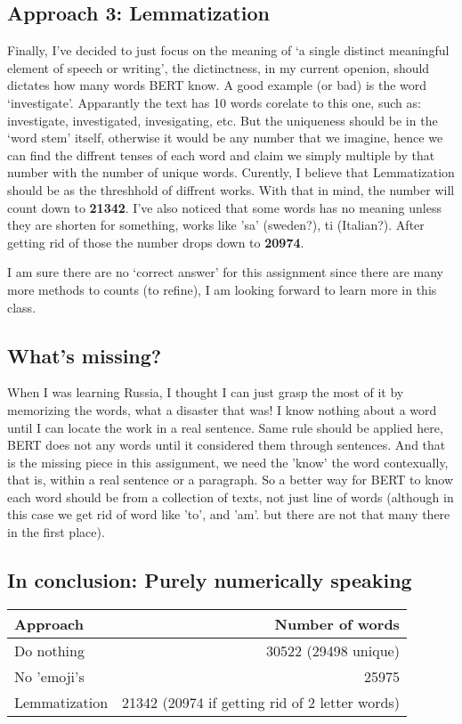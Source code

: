 \documentclass{article}
\begin{document}
		\subsection*{Approach 3: Lemmatization}
	Finally, I've decided to just focus on the meaning of `a single distinct meaningful element of speech or writing', the dictinctness, in my current openion, should dictates how many words BERT know. A good example (or bad) is the word `investigate'. Apparantly the text has 10 words corelate to this one, such as: investigate, investigated, invesigating, etc.  But the uniqueness should be in the `word  stem' itself, otherwise it would be any number that we imagine, hence we can find the diffrent tenses of each word and claim we simply multiple by that number with the number of unique words. Curently, I believe that Lemmatization should be as the threshhold of diffrent works. With that in mind, the number will count down to \textbf{21342}. I've also noticed  that some words has no meaning unless they are shorten for  something, works like 'sa' (sweden?), ti (Italian?). After getting rid of those the number drops down to \textbf{20974}. 
	
    I am sure there are no `correct answer' for this assignment since there are many more methods to counts (to refine), I am looking forward to learn more in this class. 
		\subsection*{What's missing?}
	When I was learning Russia, I thought I can just grasp the most of it by memorizing the words, what a disaster that was! I know nothing about a word until I can locate the work in a real sentence. Same rule should be applied here, BERT does not any words until it considered them through sentences. And that is the missing piece in this assignment, we need the 'know' the word contexually, that is, within a real sentence or a paragraph. So a better way for BERT to know each word should be from a collection of texts, not just line of words (although in this case we get rid of word like 'to', and 'am'. but there are not that many there in the first place).  
	\subsection*{In conclusion: Purely numerically speaking}
	{\color{blue}
\begin{center}
	\begin{tabular}{| l | r| }
		\hline
		Approach & Number of words \\ \hline
		Do nothing &  30522  (29498 unique)\\ \hline
		No 'emoji's&  25975 \\ \hline
		 Lemmatization &  21342 (20974 if getting rid of 2 letter words) \\ \hline
	\end{tabular}
\end{center}
}
\end{document}
